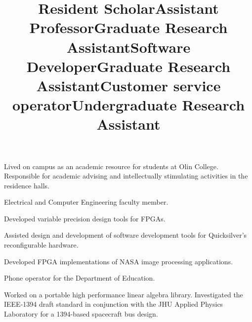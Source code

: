 \documentclass[line]{res}
\begin{document}
\begin{resume}
	\title{Resident Scholar} 
	  
	\begin{position}
		Lived on campus as an academic resource for students at Olin College. Responsible for academic advising and intellectually stimulating activities in the residence halls.
	\end{position}
	
	\title{Assistant Professor} 
	  
	\begin{position}
		Electrical and Computer Engineering faculty member. 
	\end{position}
	
	\title{Graduate Research Assistant} 
	  
	\begin{position}
		Developed variable precision design tools for FPGAs. 
	\end{position}
	
	\title{Software Developer} 
	  
	\begin{position}
		Assisted design and development of software development tools for Quicksilver's reconfigurable hardware. 
	\end{position}
	
	\title{Graduate Research Assistant} 
	  
	\begin{position}
		Developed FPGA implementations of NASA image processing applications. 
	\end{position}
	
	\title{Customer service operator} 
	  
	\begin{position}
		Phone operator for the Department of Education. 
	\end{position}
	
	\title{Undergraduate Research Assistant} 
	  
	\begin{position}
		Worked on a portable high performance linear algebra library. Investigated the IEEE-1394 draft standard in conjunction with the JHU Applied Physics Laboratory for a 1394-based spacecraft bus design. 
	\end{position}
	

\end{resume}
\end{document}
